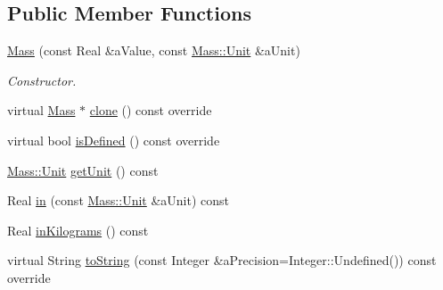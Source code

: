 \subsection*{Public Member Functions}
\begin{DoxyCompactItemize}
\item 
\hyperlink{classlibrary_1_1physics_1_1units_1_1_mass_a079df004a90cfe6cfa5c00ce0d816122}{Mass} (const Real \&a\+Value, const \hyperlink{classlibrary_1_1physics_1_1units_1_1_mass_a95f1e0434bc16794926b8e273bc2a54b}{Mass\+::\+Unit} \&a\+Unit)
\begin{DoxyCompactList}\small\item\em Constructor. \end{DoxyCompactList}\item 
virtual \hyperlink{classlibrary_1_1physics_1_1units_1_1_mass}{Mass} $\ast$ \hyperlink{classlibrary_1_1physics_1_1units_1_1_mass_a7a09438b05edbe4b21a05ec234a6372f}{clone} () const override
\item 
virtual bool \hyperlink{classlibrary_1_1physics_1_1units_1_1_mass_a0efde6eb08d6b79baa84229746776b6a}{is\+Defined} () const override
\item 
\hyperlink{classlibrary_1_1physics_1_1units_1_1_mass_a95f1e0434bc16794926b8e273bc2a54b}{Mass\+::\+Unit} \hyperlink{classlibrary_1_1physics_1_1units_1_1_mass_ab564abfc37cc17f2902445f06254082c}{get\+Unit} () const
\item 
Real \hyperlink{classlibrary_1_1physics_1_1units_1_1_mass_a85f4a66996e4b52fb5b3a71e42c4d6e3}{in} (const \hyperlink{classlibrary_1_1physics_1_1units_1_1_mass_a95f1e0434bc16794926b8e273bc2a54b}{Mass\+::\+Unit} \&a\+Unit) const
\item 
Real \hyperlink{classlibrary_1_1physics_1_1units_1_1_mass_a163fc62b4141ff5d31092dd688745518}{in\+Kilograms} () const
\item 
virtual String \hyperlink{classlibrary_1_1physics_1_1units_1_1_mass_a6e7757920752ac9f6918525d6fadb31e}{to\+String} (const Integer \&a\+Precision=Integer\+::\+Undefined()) const override
\end{DoxyCompactItemize}
